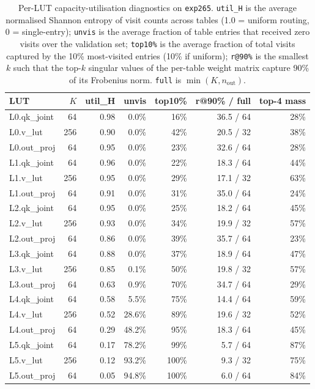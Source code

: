 \documentclass[11pt]{article}
\begin{document}
\begin{table}[!t]
\caption{Per-LUT capacity-utilisation diagnostics on \texttt{exp265}. \texttt{util\_H} is the average normalised Shannon entropy of visit counts across tables (1.0 = uniform routing, 0 = single-entry); \texttt{unvis} is the average fraction of table entries that received zero visits over the validation set; \texttt{top10\%} is the average fraction of total visits captured by the 10\% most-visited entries (10\% if uniform); \texttt{r@90\%} is the smallest $k$ such that the top-$k$ singular values of the per-table weight matrix capture 90\% of its Frobenius norm. \texttt{full} is $\min(K, n_{\text{out}})$.}
\label{tab:diag}
\centering
\small
\begin{tabular}{lrrrrrr}
\toprule
LUT & $K$ & util\_H & unvis & top10\% & r@90\% / full & top-4 mass \\
\midrule
L0.qk\_joint  & 64  & 0.98 & 0.0\%  & 16\% & 36.5 / 64 & 28\% \\
L0.v\_lut     & 256 & 0.90 & 0.0\%  & 42\% & 20.5 / 32 & 38\% \\
L0.out\_proj  & 64  & 0.95 & 0.0\%  & 23\% & 32.6 / 64 & 28\% \\
\midrule
L1.qk\_joint  & 64  & 0.96 & 0.0\%  & 22\% & 18.3 / 64 & 44\% \\
L1.v\_lut     & 256 & 0.95 & 0.0\%  & 29\% & 17.1 / 32 & 63\% \\
L1.out\_proj  & 64  & 0.91 & 0.0\%  & 31\% & 35.0 / 64 & 24\% \\
\midrule
L2.qk\_joint  & 64  & 0.95 & 0.0\%  & 25\% & 18.2 / 64 & 45\% \\
L2.v\_lut     & 256 & 0.93 & 0.0\%  & 34\% & 19.9 / 32 & 57\% \\
L2.out\_proj  & 64  & 0.86 & 0.0\%  & 39\% & 35.7 / 64 & 23\% \\
\midrule
L3.qk\_joint  & 64  & 0.88 & 0.0\%  & 37\% & 18.9 / 64 & 47\% \\
L3.v\_lut     & 256 & 0.85 & 0.1\%  & 50\% & 19.8 / 32 & 57\% \\
L3.out\_proj  & 64  & 0.63 & 0.9\%  & 70\% & 34.7 / 64 & 29\% \\
\midrule
L4.qk\_joint  & 64  & 0.58 & 5.5\%  & 75\% & 14.4 / 64 & 59\% \\
L4.v\_lut     & 256 & 0.52 & 28.6\% & 89\% & 19.6 / 32 & 52\% \\
L4.out\_proj  & 64  & 0.29 & 48.2\% & 95\% & 18.3 / 64 & 45\% \\
\midrule
L5.qk\_joint  & 64  & 0.17 & 78.2\% & 99\% &  5.7 / 64 & 87\% \\
L5.v\_lut     & 256 & 0.12 & 93.2\% &100\% &  9.3 / 32 & 75\% \\
L5.out\_proj  & 64  & 0.05 & 94.8\% &100\% &  6.0 / 64 & 84\% \\
\bottomrule
\end{tabular}
\end{table}
\end{document}
